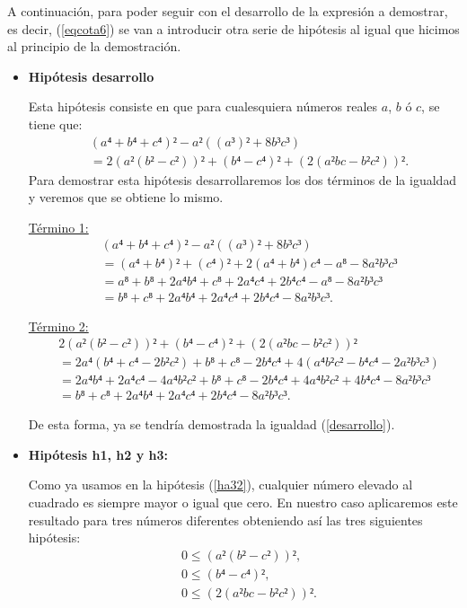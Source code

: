 \begin{demostracion}
  A continuación, para poder seguir con el desarrollo de la expresión a
  demostrar, es decir, (\ref{eqcota6}) se van a introducir otra serie de
  hipótesis al igual que hicimos al principio de la demostración.
  \begin{itemize}
  \item \textbf{Hipótesis desarrollo}

    Esta hipótesis consiste en que para cualesquiera números reales \(a\),
    \(b\) ó \(c\), se tiene que:
    \begin{align*}\label{desarrollo}\tag{desarrollo}
      & (a⁴+b⁴+c⁴)²-a²((a³)²+8b³c³) \\
      & = 2(a²(b²-c²))²+(b⁴-c⁴)²+(2(a²bc-b²c²))².
    \end{align*}
    Para demostrar esta hipótesis desarrollaremos los dos términos de la
    igualdad y veremos que se obtiene lo mismo.

    \underline{Término 1:}
    \begin{align*}
      & (a⁴+b⁴+c⁴)²-a²((a³)²+8b³c³)\\
      & = (a⁴+b⁴)²+(c⁴)²+2(a⁴+b⁴)c⁴-a⁸-8a²b³c³\\
      & = a⁸+b⁸+2a⁴b⁴+c⁸+2a⁴c⁴+2b⁴c⁴-a⁸-8a²b³c³\\
      & = b⁸+c⁸+2a⁴b⁴+2a⁴c⁴+2b⁴c⁴-8a²b³c³.
    \end{align*}

    \underline{Término 2:}
    \begin{align*}
      & 2(a²(b²-c²))²+(b⁴-c⁴)²+(2(a²bc-b²c²))² \\
      & = 2a⁴(b⁴+c⁴-2b²c²)+b⁸+c⁸-2b⁴c⁴+4(a⁴b²c²-b⁴c⁴-2a²b³c³)\\
      & = 2a⁴b⁴+2a⁴c⁴-4a⁴b²c²+b⁸+c⁸-2b⁴c⁴+4a⁴b²c²+4b⁴c⁴-8a²b³c³\\
      & = b⁸+c⁸+2a⁴b⁴+2a⁴c⁴+2b⁴c⁴-8a²b³c³.
    \end{align*}

    De esta forma, ya se tendría demostrada la igualdad (\ref{desarrollo}).

  \item \textbf{Hipótesis h1, h2 y h3:}

    Como ya usamos en la hipótesis (\ref{ha32}), cualquier número
    elevado al cuadrado es siempre mayor o igual que cero. En nuestro caso
    aplicaremos este resultado para tres números diferentes obteniendo
    así las tres siguientes hipótesis:
    \begin{align}
      &0 ≤ (a²(b²-c²))²,\label{h1cota}\tag{h1}\\
      &0 ≤ (b⁴-c⁴)², \label{h2cota}\tag{h2}\\
      &0 ≤ (2(a²bc-b²c²))².\label{h3cota}\tag{h3}
    \end{align}


\end{itemize}
\end{demostracion}
